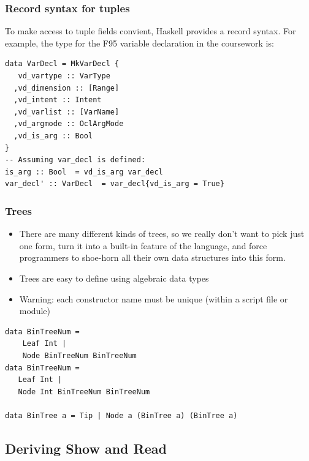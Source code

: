 \documentclass{beamer}
\begin{document}
\begin{frame}[fragile]
\frametitle{Record syntax for tuples}

To make access to tuple fields convient, Haskell provides a record syntax. For example, the type for the F95 variable declaration in the coursework is:

\begin{verbatim}
data VarDecl = MkVarDecl {
   vd_vartype :: VarType
  ,vd_dimension :: [Range]	
  ,vd_intent :: Intent
  ,vd_varlist :: [VarName]
  ,vd_argmode :: OclArgMode
  ,vd_is_arg :: Bool
} 
-- Assuming var_decl is defined:
is_arg :: Bool  = vd_is_arg var_decl 
var_decl' :: VarDecl  = var_decl{vd_is_arg = True}

\end{verbatim}



\end{frame}

\begin{frame}[fragile]
\frametitle{Trees}

\begin{itemize}
\item There are many different kinds of trees, so we really don't
  want to pick just one form, turn it into a built-in feature of
  the language, and force programmers to shoe-horn all their own
  data structures into this form.
\item Trees are easy to define using algebraic data types
\item Warning: each constructor name must be unique (within a
  script file or module)
\end{itemize}

\begin{verbatim}
data BinTreeNum =
    Leaf Int | 
    Node BinTreeNum BinTreeNum
data BinTreeNum = 
   Leaf Int | 
   Node Int BinTreeNum BinTreeNum

data BinTree a = Tip | Node a (BinTree a) (BinTree a)
\end{verbatim}

\end{frame}

\subsection{Deriving Show and Read}
\end{document}

